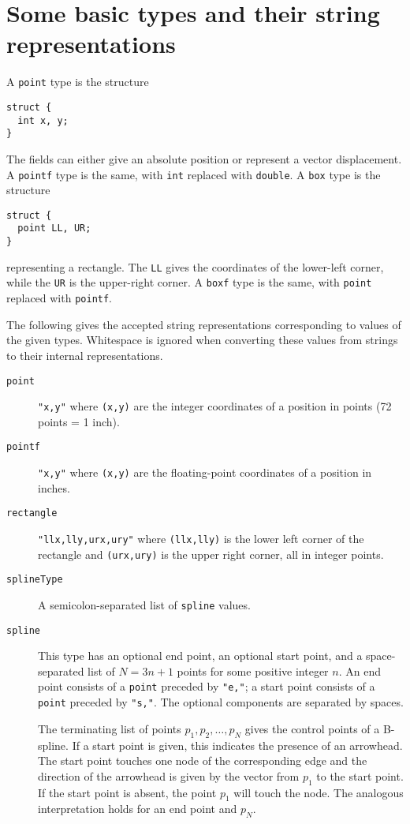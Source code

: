 \section{Some basic types and their string representations}
\label{sec:types}
A {\tt point} type is the structure
\begin{verbatim}
struct {
  int x, y;
}
\end{verbatim}
The fields can either give an absolute position or represent a
vector displacement.
A {\tt pointf} type is the same, with {\tt int} replaced with {\tt double}.
A {\tt box} type is the structure
\begin{verbatim}
struct {
  point LL, UR;
}
\end{verbatim}
representing a rectangle. The {\tt LL} gives the coordinates of the
lower-left corner, while the {\tt UR} is the upper-right corner.
A {\tt boxf} type is the same, with {\tt point} replaced with {\tt pointf}.

The following gives the accepted string representations 
corresponding to values of the given types. 
Whitespace is ignored when converting these values from strings
to their internal representations. 

\begin{description}
\item[{\tt point}] {\tt "x,y"} where {\tt (x,y)} are the integer coordinates 
of a position in points (72 points = 1 inch).
\item[{\tt pointf}] {\tt "x,y"} where {\tt (x,y)} are the 
floating-point coordinates of a position in inches.
\item[{\tt rectangle}] {\tt "llx,lly,urx,ury"} 
where {\tt (llx,lly)} is the lower left corner
of the rectangle and {\tt (urx,ury)} is the upper right corner, 
all in integer points.
\item[{\tt splineType}] A semicolon-separated list of {\tt spline} values.
\item[{\tt spline}] This type has an optional end point, an optional start
point, and a space-separated list of $N = 3n+1$ points for some positive 
integer $n$. An end point consists of a {\tt point} preceded by {\tt "e,"};
a start point consists of a {\tt point} preceded by {\tt "s,"}. The
optional components are separated by spaces.  

The terminating list of points $p_1,p_2,\ldots ,p_N$ gives the control points 
of a B-spline.
If a start point is given, this indicates the presence of an arrowhead.
The start point touches one node of the corresponding edge 
and the direction of the arrowhead is given by the vector from $p_1$
to the start point. If the start point is absent, the point $p_1$
will touch the node. The analogous interpretation holds for an end point
and $p_N$.
\end{description}
